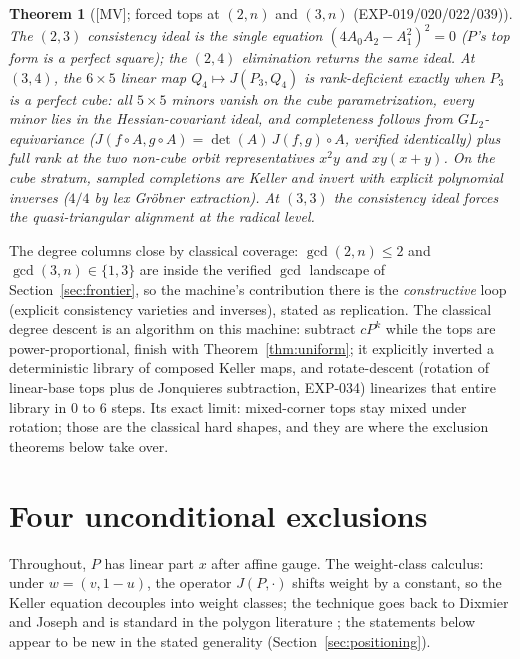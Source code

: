 \documentclass[11pt]{article}
\newtheorem{theorem}{Theorem}[section]
\theoremstyle{remark}
\begin{document}
\begin{theorem}[{[MV]}; forced tops at $(2, n)$ and $(3, n)$ (EXP-019/020/022/039)]
\label{thm:forced}
The $(2,3)$ consistency ideal is the single equation $(4A_0A_2 - A_1^2)^2 = 0$ ($P$'s top
form is a perfect square); the $(2,4)$ elimination returns the same ideal. At $(3, 4)$, the
$6 \times 5$ linear map $Q_4 \mapsto J(P_3, Q_4)$ is rank-deficient exactly when $P_3$ is a
perfect cube: all $5 \times 5$ minors vanish on the cube parametrization, every minor lies in
the Hessian-covariant ideal, and completeness follows from $GL_2$-equivariance
($J(f \circ A, g \circ A) = \det(A)\, J(f, g) \circ A$, verified identically) plus full rank
at the two non-cube orbit representatives $x^2 y$ and $x y (x + y)$. On the cube stratum,
sampled completions are Keller and invert with explicit polynomial inverses ($4/4$ by lex
Gr\"obner extraction). At $(3,3)$ the consistency ideal forces the quasi-triangular alignment
at the radical level.
\end{theorem}

The degree columns close by classical coverage: $\gcd(2, n) \le 2$ and $\gcd(3, n) \in
\{1, 3\}$ are inside the verified $\gcd$ landscape of Section~\ref{sec:frontier}, so the
machine's contribution there is the \emph{constructive} loop (explicit consistency varieties
and inverses), stated as replication. The classical degree descent is an algorithm on this
machine: subtract $c P^k$ while the tops are power-proportional, finish with
Theorem~\ref{thm:uniform}; it explicitly inverted a deterministic library of composed Keller
maps, and rotate-descent (rotation of linear-base tops plus de Jonquieres subtraction,
EXP-034) linearizes that entire library in $0$ to $6$ steps. Its exact limit: mixed-corner
tops stay mixed under rotation; those are the classical hard shapes, and they are where the
exclusion theorems below take over.

\section{Four unconditional exclusions}

Throughout, $P$ has linear part $x$ after affine gauge. The weight-class calculus: under
$w = (v, 1 - u)$, the operator $J(P, \cdot)$ shifts weight by a constant, so the Keller
equation decouples into weight classes; the technique goes back to Dixmier and Joseph
\cite{Joseph1975} and is standard in the polygon literature \cite{GGV2017}; the statements
below appear to be new in the stated generality (Section~\ref{sec:positioning}).
\end{document}
